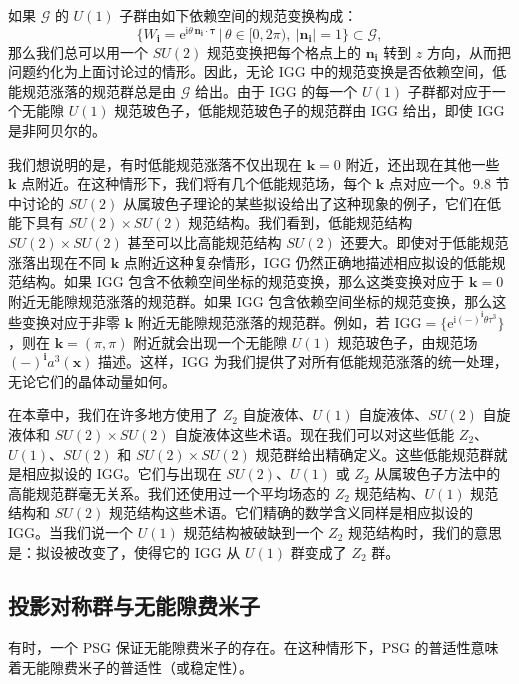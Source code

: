 如果 $\mathcal{G}$ 的 $U(1)$ 子群由如下依赖空间的规范变换构成：
\begin{equation*}
\{W_{\pmb{i}}=\mathrm{e}^{\mathrm{i}\theta\,\pmb{n}_{\pmb{i}}\cdot\pmb{\tau}}\,|\,\theta\in[0,2\pi),\ |\pmb{n}_{\pmb{i}}|=1\}\subset\mathcal{G},
\end{equation*}
那么我们总可以用一个 $SU(2)$ 规范变换把每个格点上的 $\pmb{n}_{\pmb{i}}$ 转到 $z$ 方向，从而把问题约化为上面讨论过的情形。因此，无论 IGG 中的规范变换是否依赖空间，低能规范涨落的规范群总是由 $\mathcal{G}$ 给出。由于 IGG 的每一个 $U(1)$ 子群都对应于一个无能隙 $U(1)$ 规范玻色子，低能规范玻色子的规范群由 IGG 给出，即使 IGG 是非阿贝尔的。

我们想说明的是，有时低能规范涨落不仅出现在 $\pmb{k}=0$ 附近，还出现在其他一些 $\pmb{k}$ 点附近。在这种情形下，我们将有几个低能规范场，每个 $\pmb{k}$ 点对应一个。9.8 节中讨论的 $SU(2)$ 从属玻色子理论的某些拟设给出了这种现象的例子，它们在低能下具有 $SU(2)\times SU(2)$ 规范结构。我们看到，低能规范结构 $SU(2)\times SU(2)$ 甚至可以比高能规范结构 $SU(2)$ 还要大。即使对于低能规范涨落出现在不同 $\pmb{k}$ 点附近这种复杂情形，IGG 仍然正确地描述相应拟设的低能规范结构。如果 IGG 包含不依赖空间坐标的规范变换，那么这类变换对应于 $\pmb{k}=0$ 附近无能隙规范涨落的规范群。如果 IGG 包含依赖空间坐标的规范变换，那么这些变换对应于非零 $\pmb{k}$ 附近无能隙规范涨落的规范群。例如，若 $\mathrm{IGG}=\{\mathrm{e}^{\mathrm{i}(-)^{\pmb{i}}\theta\tau^{3}}\}$，则在 $\pmb{k}=(\pi,\pi)$ 附近就会出现一个无能隙 $U(1)$ 规范玻色子，由规范场 $(-)^{\pmb{i}}a^{3}(\pmb{x})$ 描述。这样，IGG 为我们提供了对所有低能规范涨落的统一处理，无论它们的晶体动量如何。

在本章中，我们在许多地方使用了 $Z_2$ 自旋液体、$U(1)$ 自旋液体、$SU(2)$ 自旋液体和 $SU(2)\times SU(2)$ 自旋液体这些术语。现在我们可以对这些低能 $Z_2$、$U(1)$、$SU(2)$ 和 $SU(2)\times SU(2)$ 规范群给出精确定义。这些低能规范群就是相应拟设的 IGG。它们与出现在 $SU(2)$、$U(1)$ 或 $Z_2$ 从属玻色子方法中的高能规范群毫无关系。我们还使用过一个平均场态的 $Z_2$ 规范结构、$U(1)$ 规范结构和 $SU(2)$ 规范结构这些术语。它们精确的数学含义同样是相应拟设的 IGG。当我们说一个 $U(1)$ 规范结构被破缺到一个 $Z_2$ 规范结构时，我们的意思是：拟设被改变了，使得它的 IGG 从 $U(1)$ 群变成了 $Z_2$ 群。

\subsection{投影对称群与无能隙费米子}

\begin{keypoints}
\item 有时，一个 PSG 保证无能隙费米子的存在。在这种情形下，PSG 的普适性意味着无能隙费米子的普适性（或稳定性）。
\end{keypoints}

